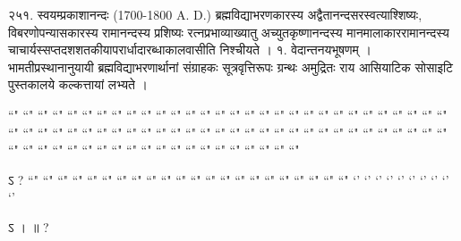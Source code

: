 २५१. स्वयम्प्रकाशानन्दः (1700-1800 A. D.)
ब्रह्मविद्याभरणकारस्य अद्वैतानन्दसरस्वत्याश्शिष्यः, विबरणोपन्यासकारस्य रामानन्दस्य प्रशिष्यः रत्नप्रभाव्याख्यातु अच्युतकृष्णानन्दस्य मानमालाकाररामानन्दस्य चाचार्यस्सप्तदशशतकीयापरार्धादारब्धाकालवासीति निश्चीयते ।
१. वेदान्तनयभूषणम् । भामतीप्रस्थानानुयायी ब्रह्मविद्याभरणार्थानां संग्राहकः सूत्रवृत्तिरूपः ग्रन्थः अमुद्रितः राय आसियाटिक सोसाइटि पुस्तकालये कल्कत्तायां लभ्यते ।



 ``" ``" ``" ``" ``" ``" ``" ``" ``" ``" ``" ``" ``" ``" ``" ``" ``" ``" ``" ``" ``" ``" ``" ``" ``" ``" ``" ``" ``" ``" ``" ``" ``" ``" ``" ``" ``" ``" ``" ``" ``" ``" ``" ``" ``" ``" ``" ``" ``" ``" ``" ``" ``" ``" ``" ``" ``" ``" ``" ``" ``" ``" ``" ``" ``" ``" ``" ``" ``" ``" ``" ``" ``" ``" ``" ``" ``" ``" ``" ``"

ऽ  ?
``" ``" ``" ``" ``" ``" ``" ``" ``" ``" ``" ``" ``" ``" ``" ``" ``" ``" ``" ``" ``" ``"
`' `' `' `' `' `' `' `' `' `' 
 
ऽ  ।   ॥ ?
